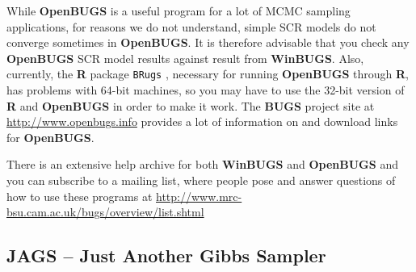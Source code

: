 While {\bf OpenBUGS} is a useful program for a lot of MCMC sampling
applications, for reasons we do not understand, simple SCR models do
not converge sometimes in {\bf OpenBUGS}. It is therefore advisable that 
you check any
{\bf OpenBUGS} SCR model results against result from {\bf WinBUGS}. Also,
currently, the {\bf R} package \mbox{\tt BRugs} \citep{thomas_etal:2006}, 
necessary
for running {\bf OpenBUGS} through {\bf R}, has problems with 64-bit 
machines, so
you may have to use the 32-bit version of {\bf R} and {\bf OpenBUGS} 
in order to
make it work. The {\bf BUGS} project site at 
\url{http://www.openbugs.info}
provides a lot of information on and download links for {\bf OpenBUGS}.

There is an extensive help archive for both {\bf WinBUGS} and {\bf OpenBUGS}
 and you can subscribe to a mailing list, where people pose and answer 
 questions of how to use these programs at 
 \url{http://www.mrc-bsu.cam.ac.uk/bugs/overview/list.shtml}

\subsection{JAGS -- Just Another Gibbs Sampler}

